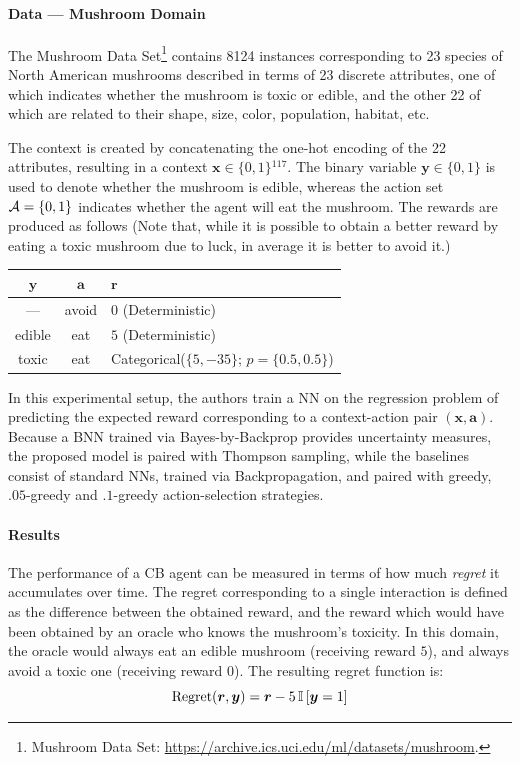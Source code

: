 \documentclass[11pt]{article}
\begin{document}
\paragraph{Data --- Mushroom Domain} The Mushroom Data Set\footnote{Mushroom
Data Set: \url{https://archive.ics.uci.edu/ml/datasets/mushroom}.} contains
8124 instances corresponding to 23 species of North American mushrooms
described in terms of 23 discrete attributes, one of which indicates whether
the mushroom is toxic or edible, and the other 22 of which are related to their
shape, size, color, population, habitat, etc.

The context is created by concatenating the one-hot encoding of the 22
attributes, resulting in a context $\bm x\in \{0, 1\}{}^{117}$.  The binary
variable $\bm y\in\{0, 1\}$ is used to denote whether the mushroom is edible,
whereas the action set ${\mathcal{A}} = \{0, 1\}$ indicates whether the agent will eat
the mushroom.  The rewards are produced as follows
(Note that, while it is possible to obtain a better reward by eating a toxic
mushroom due to luck, in average it is better to avoid it.)

\begin{center}
\begin{tabular}{ccl}
  $\bm y$ & $\bm a$ & $\bm r$ \\ 
  \toprule
  --- & avoid & $0$ (Deterministic) \\
  edible & eat & $5$ (Deterministic) \\
  toxic & eat & Categorical\@($\{5, -35\}$; $p=\{0.5, 0.5\}$) \\  
\end{tabular}
\end{center}

In this experimental setup, the authors train a NN on the regression problem of
predicting the expected reward corresponding to a context-action pair $(\bm x,
\bm a)$.  
Because a BNN trained via Bayes-by-Backprop provides
uncertainty measures, the proposed model is paired with Thompson sampling,
while the baselines consist of standard NNs, trained via Backpropagation, and
paired with greedy, $.05$-greedy and $.1$-greedy action-selection strategies.


\paragraph{Results} 

The performance of a CB agent can be measured in terms of how much
\emph{regret} it accumulates over time.  The regret corresponding to a single
interaction is defined as the difference between the obtained reward, and the
reward which would have been obtained by an oracle who knows the mushroom's
toxicity.  In this domain, the oracle would always eat an edible mushroom
(receiving reward $5$), and always avoid a toxic one (receiving reward $0$).
The resulting regret function is:
%
\begin{equation}
  \operatorname{Regret}(\bm r, \bm y) = \bm r - 5 \, {\mathbb{I}}\left[ \bm
  y = 1 \right]
\end{equation}
\end{document}
